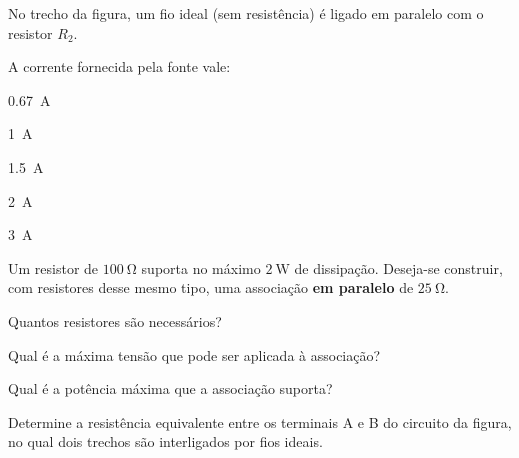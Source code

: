 \begin{questao}[2]{}

No trecho da figura, um fio ideal (sem resistência) é ligado em paralelo com o
resistor $R_2$.


A corrente fornecida pela fonte vale:
\begin{alternativas}[3]
\item \SI{0.67}{\ampere}
\item \SI{1}{\ampere}
\item \SI{1.5}{\ampere}
\item \SI{2}{\ampere}
\item \SI{3}{\ampere}
\end{alternativas}


\end{questao}

\blocoaprofundamento
\begin{questao}[3]{}

Um resistor de $\SI{100}{\ohm}$ suporta no máximo $\SI{2}{\watt}$ de dissipação.
Deseja-se construir, com resistores desse mesmo tipo, uma associação
\textbf{em paralelo} de $\SI{25}{\ohm}$.
\begin{itensq}
\item Quantos resistores são necessários?
\item Qual é a máxima tensão que pode ser aplicada à associação?
\item Qual é a potência máxima que a associação suporta?
\end{itensq}


\end{questao}
\begin{questao}[3]{}

Determine a resistência equivalente entre os terminais A e B do circuito da
figura, no qual dois trechos são interligados por fios ideais.




\end{questao}

